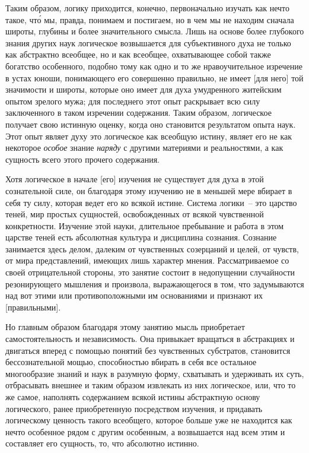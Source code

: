 Таким образом, логику приходится, конечно, первоначально
изучать как нечто такое, чт\'о мы, правда, понимаем
и постигаем, но в чем мы не находим сначала широты,
глубины и более значительного смысла. Лишь
на основе более глубокого знания других наук логическое
возвышается для субъективного духа не только как
абстрактно всеобщее, но и как всеобщее, охватывающее
собой также богатство особенного, подобно тому как одно
и то же нравоучительное изречение в устах юноши, понимающего
его совершенно правильно, не имеет [для
него] той значимости и широты, которые оно имеет
для духа умудренного житейским опытом зрелого мужа;
для последнего этот опыт раскрывает всю силу заключенного
в таком изречении содержания. Таким образом,
логическое получает свою истинную оценку, когда оно
становится результатом опыта наук. Этот опыт являет
духу это логическое как всеобщую истину, являет его
не как некоторое \emph{особое} знание \emph{наряду} с другими материями
и реальностями, а как сущность всего этого прочего
содержания.

Хотя логическое в начале [его] изучения не существует
для духа в этой сознательной силе, он благодаря этому
изучению не в меньшей мере вбирает в себя ту силу,
которая ведет его ко всякой истине. Система логики~--
это царство теней, мир простых сущностей, освобожденных
от всякой чувственной конкретности. Изучение этой
науки, длительное пребывание и работа в этом царстве
теней есть абсолютная культура и дисциплина сознания.
Сознание занимается здесь делом, далеким от чувственных
созерцаний и целей, от чувств, от мира представлений,
имеющих лишь характер мнения. Рассматриваемое
со своей отрицательной стороны, это занятие состоит
в недопущении случайности резонирующего мышления
и произвола, выражающегося в том, что задумываются
над вот этими или противоположными им основаниями
и признают их [правильными].

Но главным образом благодаря этому занятию мысль
приобретает самостоятельность и независимость. Она привыкает
вращаться в абстракциях и двигаться вперед
с помощью понятий без чувственных субстратов, становится
бессознательной мощью, способностью вбирать
в себя все остальное многообразие знаний и наук в разумную
форму, схватывать и удерживать их суть, отбрасывать
внешнее и таким образом извлекать из них логическое,
или, что то же самое, наполнять содержанием
всякой истины абстрактную основу логического, ранее
приобретенную посредством изучения, и придавать логическому
ценность такого всеобщего, которое больше уже
не находится как нечто особенное рядом с другим особенным,
а возвышается над всем этим и составляет его
сущность, то, что абсолютно истинно.


